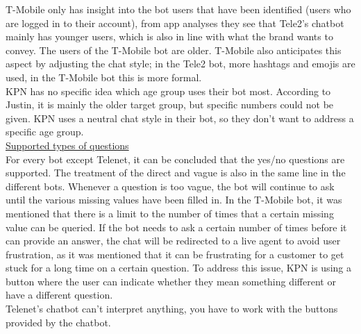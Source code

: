 \break
T-Mobile only has insight into the bot users that have been identified (users who are logged in to their account), from app analyses they see that Tele2's chatbot mainly has younger users, which is also in line with what the brand wants to convey. The users of the T-Mobile bot are older. T-Mobile also anticipates this aspect by adjusting the chat style; in the Tele2 bot, more hashtags and emojis are used, in the T-Mobile bot this is more formal.\\
\break
KPN has no specific idea which age group uses their bot most. According to Justin, it is mainly the older target group, but specific numbers could not be given. KPN uses a neutral chat style in their bot, so they don't want to address a specific age group.\\
\break
\ul{Supported types of questions}\\
For every bot except Telenet, it can be concluded that the yes/no questions are supported. The treatment of the direct and vague is also in the same line in the different bots. Whenever a question is too vague, the bot will continue to ask until the various missing values have been filled in. In the T-Mobile bot, it was mentioned that there is a limit to the number of times that a certain missing value can be queried. If the bot needs to ask a certain number of times before it can provide an answer, the chat will be redirected to a live agent to avoid user frustration, as it was mentioned that it can be frustrating for a customer to get stuck for a long time on a certain question. To address this issue, KPN is using a button where the user can indicate whether they mean something different or have a different question.\\
Telenet's chatbot can't interpret anything, you have to work with the buttons provided by the chatbot.\\
\break
